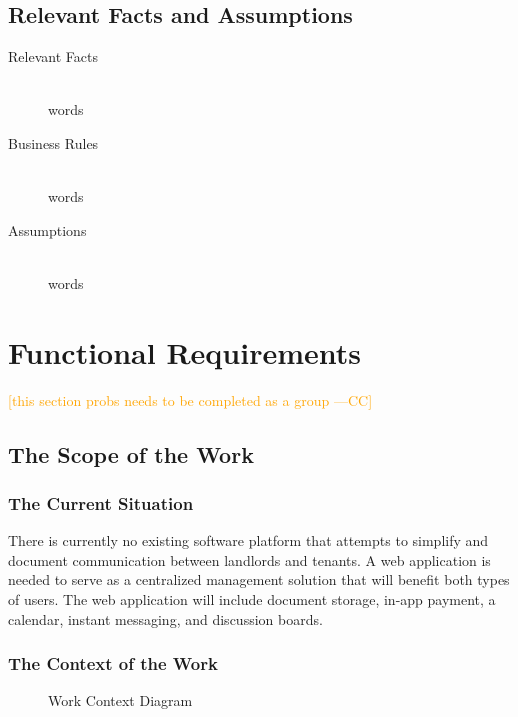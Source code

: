 \documentclass[12pt, titlepage]{article}
\newcommand{\authornote}[3]{\textcolor{#1}{[#3 ---#2]}}
\newcommand{\authornote}[3]{}
\newcommand{\cc}[1]{\authornote{orange}{CC}{#1}}
\begin{document}
\subsection{Relevant Facts and Assumptions} %
\begin{description}
  \item[Relevant Facts] \hfill \\
    words
  \item[Business Rules] \hfill \\
    words
  \item[Assumptions] \hfill \\
    words
\end{description}  

\section{Functional Requirements} \cc{this section probs needs to be completed as a group}
\subsection{The Scope of the Work}
\subsubsection{The Current Situation}
There is currently no existing software platform that attempts to simplify and document communication between landlords and tenants. A web application is needed to serve as a centralized management solution that will benefit both types of users. The web application will include document storage, in-app payment, a calendar, instant messaging, and discussion boards.  
\subsubsection{The Context of the Work} 
\begin{figure}[H]
\centering
{}
\caption{Work Context Diagram}
\end{figure}
\end{document}
